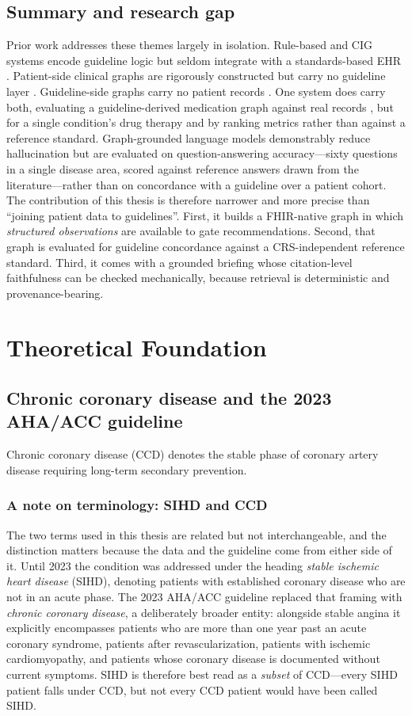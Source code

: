 \subsection{Summary and research gap}
Prior work addresses these themes largely in isolation. Rule-based and CIG systems encode
guideline logic but seldom integrate with a standards-based EHR
\cite{papadopoulos2022}. Patient-side clinical graphs are rigorously
constructed but carry no guideline layer \cite{xiao2022}. Guideline-side graphs carry no
patient records \cite{cui2025}. One system does carry both, evaluating a guideline-derived
medication graph against real records \cite{zhou2022}, but for a single condition's drug
therapy and by ranking metrics rather than against a reference standard.
Graph-grounded language models demonstrably reduce
hallucination \cite{ali2026} but are evaluated on question-answering accuracy---sixty
questions in a single disease area, scored against reference answers drawn from the
literature---rather than on concordance with a guideline over a patient cohort. The contribution of this thesis is therefore narrower and more precise than ``joining
patient data to guidelines''. First, it builds a FHIR-native graph in which \emph{structured
observations} are available to gate recommendations. Second, that graph is evaluated for
guideline concordance against a CRS-independent reference standard. Third, it comes with a
grounded briefing whose citation-level faithfulness can be checked mechanically, because
retrieval is deterministic and provenance-bearing.


\section{Theoretical Foundation}

\subsection{Chronic coronary disease and the 2023 AHA/ACC guideline}
Chronic coronary disease (CCD) denotes the stable phase of coronary artery disease requiring
long-term secondary prevention.

\subsubsection*{A note on terminology: SIHD and CCD}
The two terms used in this thesis are related but not interchangeable, and the distinction
matters because the data and the guideline come from either side of it. Until 2023 the
condition was addressed under the heading \emph{stable ischemic heart disease} (SIHD),
denoting patients with established coronary disease who are not in an acute phase. The 2023
AHA/ACC guideline \cite{virani2023} replaced that framing with \emph{chronic coronary
disease}, a deliberately broader entity: alongside stable angina it explicitly encompasses
patients who are more than one year past an acute coronary syndrome, patients after
revascularization, patients with ischemic cardiomyopathy, and patients whose coronary
disease is documented without current symptoms. SIHD is therefore best read as a
\emph{subset} of CCD---every SIHD patient falls under CCD, but not every CCD patient would
have been called SIHD.


